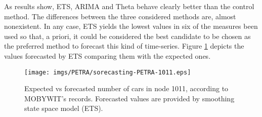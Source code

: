 As results show, ETS, ARIMA and Theta behave clearly better than the control method. The differences between the three considered methods are, almost nonexistent. In any case, ETS yields the lowest values in six of the measures been used so that, a priori, it could be considered the best candidate to be chosen as the preferred method to forecast this kind of time-series. Figure \ref{fig:forecasted-values} depicts the values forecasted by ETS comparing them with the expected ones.


\begin{figure}[!ht]
	\begin{center}
		\texttt{[image: imgs/PETRA/sorecasting-PETRA-1011.eps]}
		\caption{Expected vs forecasted number of cars in node 1011, according to MOBYWIT's records. Forecasted values are provided by smoothing state space model (ETS). }
		\label{fig:forecasted-values}
	\end{center}
\end{figure}



